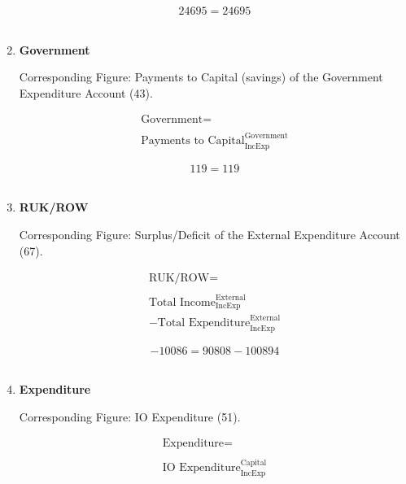 \begin{enumerate}
\begin{equation} \nonumber
24695 = 24695
\end{equation}\\


\item \textbf {Government}

Corresponding Figure: Payments to Capital (savings) of the Government Expenditure Account (43).

\begin{equation}
\begin{split}
\text{Government} =  \\ \\
\text{Payments to Capital}^\text{Government}_\text{IncExp}
\end{split} \label{eq:2.5.51}
\end{equation}

\begin{equation} \nonumber
119 = 119
\end{equation}\\


\item \textbf {RUK/ROW}

Corresponding Figure: Surplus/Deficit of the External Expenditure Account (67).

\begin{equation}
\begin{split}
\text{RUK/ROW} =  \\ \\
\text{Total Income}^\text{External}_\text{IncExp}\\
-\text{Total Expenditure}^\text{External}_\text{IncExp}
\end{split} \label{eq:2.5.52}
\end{equation}

\begin{equation} \nonumber
-10086 = 90808-100894
\end{equation}\\


\pagebreak

\item \textbf {Expenditure}

Corresponding Figure: IO Expenditure (51).
	
\begin{equation}
\begin{split}
\text{Expenditure} =  \\ \\
\text{IO Expenditure}^\text{Capital}_\text{IncExp}
\end{split} \label{eq:2.5.53}
\end{equation}


\end{enumerate}
